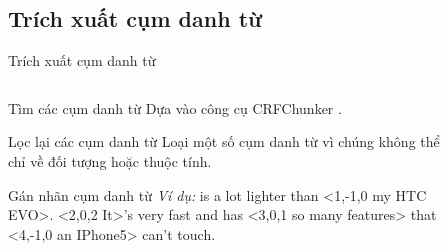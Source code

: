 \documentclass[9pt,xcolor=table,hyperref=unicode]{beamer}
\begin{document}
	\subsection{Trích xuất cụm danh từ}
	\begin{frame}{Trích xuất cụm danh từ}			
		\begin{columns}[t]
			\begin{column}{0.7\textwidth}
			   	\begin{block}{Tìm các cụm danh từ}
	   				Dựa vào công cụ CRFChunker \footnotemark.
				\end{block}
				\begin{block}{Lọc lại các cụm danh từ}
			   		Loại một số cụm danh từ vì chúng không thể chỉ về đối tượng hoặc thuộc tính.				
				\end{block}
				\begin{block}{Gán nhãn cụm danh từ}					
					\textit{Ví dụ:} \fontsize{9pt}{9}\selectfont <0,-1,0 The Note 3> is a lot lighter than <1,-1,0 my HTC EVO>. <2,0,2 It>'s very fast and has <3,0,1 so many features> that <4,-1,0 an IPhone5> can't touch. 
				\end{block}
			\end{column}
			\begin{column}{0.3\textwidth}  %
			 	\begin{figure}[H]
					\fontsize{13pt}{13}\selectfont
					\centering				
					\resizebox{20mm}{!}{}	
				\end{figure}
			\end{column}
		\end{columns}
		\begin{columns}[t]
			\begin{column}{\textwidth}				
			   	\begin{figure}[H]
					\LARGE 
					\resizebox{100mm}{!}{}										
				\end{figure}
			\end{column}			
		\end{columns}
	\end{frame}
\end{document}
